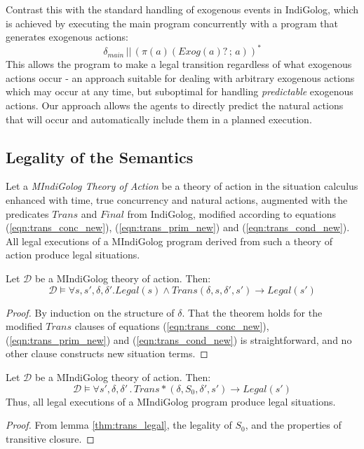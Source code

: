 Contrast this with the standard handling of exogenous events in IndiGolog,
which is achieved by executing the main program concurrently with
a program that generates exogenous actions:\[
\delta_{main}\,||\,\left(\pi(a)(Exog(a)?\,;\, a)\right)^{*}\]
 This allows the program to make a legal transition regardless of
what exogenous actions occur - an approach suitable for dealing with
arbitrary exogenous actions which may occur at any time, but suboptimal
for handling \emph{predictable} exogenous actions. Our approach allows
the agents to directly predict the natural actions that will occur
and automatically include them in a planned execution.


\subsection{Legality of the Semantics}

Let a \emph{MIndiGolog Theory of Action} be a theory of action in
the situation calculus enhanced with time, true concurrency and natural
actions, augmented with the predicates $Trans$ and $Final$ from
IndiGolog, modified according to equations (\ref{eqn:trans_conc_new}),
(\ref{eqn:trans_prim_new}) and (\ref{eqn:trans_cond_new}). All legal
executions of a MIndiGolog program derived from such a theory of action
produce legal situations.

\begin{lemma} Let $\mathcal{D}$ be a MIndiGolog theory of action.
Then:\label{thm:trans_legal}\[
\mathcal{D}\models\forall s,s',\delta,\delta'.Legal(s)\wedge Trans(\delta,s,\delta',s')\rightarrow Legal(s')\]


\end{lemma} \begin{proof} By induction on the structure of $\delta$.
That the theorem holds for the modified $Trans$ clauses of equations
(\ref{eqn:trans_conc_new}), (\ref{eqn:trans_prim_new}) and (\ref{eqn:trans_cond_new})
is straightforward, and no other clause constructs new situation terms.
\end{proof} 

\begin{thm} Let $\mathcal{D}$ be a MIndiGolog theory of action.
Then: \[
\mathcal{D}\models\forall s',\delta,\delta'\,.\, Trans*(\delta,S_{0},\delta',s')\rightarrow Legal(s')\]
 \newpage{}Thus, all legal executions of a MIndiGolog program produce
legal situations. \end{thm} \begin{proof} From lemma \ref{thm:trans_legal},
the legality of $S_{0}$, and the properties of transitive closure.
\end{proof} 


